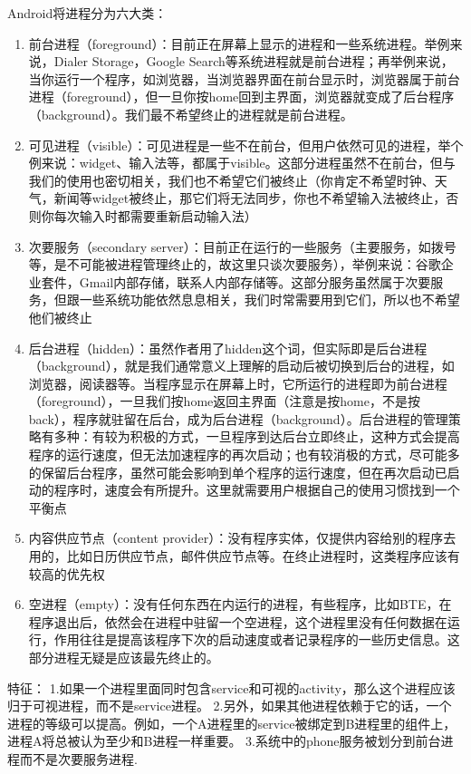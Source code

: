 \documentclass[a4paper, 11pt]{article}
\begin{document}
Android将进程分为六大类：
\begin{enumerate}
    \item 前台进程（foreground）：目前正在屏幕上显示的进程和一些系统进程。举例来说，Dialer Storage，Google Search等系统进程就是前台进程；再举例来说，当你运行一个程序，如浏览器，当浏览器界面在前台显示时，浏览器属于前台进程（foreground），但一旦你按home回到主界面，浏览器就变成了后台程序（background）。我们最不希望终止的进程就是前台进程。
    \item 可见进程（visible）：可见进程是一些不在前台，但用户依然可见的进程，举个例来说：widget、输入法等，都属于visible。这部分进程虽然不在前台，但与我们的使用也密切相关，我们也不希望它们被终止（你肯定不希望时钟、天气，新闻等widget被终止，那它们将无法同步，你也不希望输入法被终止，否则你每次输入时都需要重新启动输入法）
    \item 次要服务（secondary server）：目前正在运行的一些服务（主要服务，如拨号等，是不可能被进程管理终止的，故这里只谈次要服务），举例来说：谷歌企业套件，Gmail内部存储，联系人内部存储等。这部分服务虽然属于次要服务，但跟一些系统功能依然息息相关，我们时常需要用到它们，所以也不希望他们被终止
    \item 后台进程（hidden）：虽然作者用了hidden这个词，但实际即是后台进程（background），就是我们通常意义上理解的启动后被切换到后台的进程，如浏览器，阅读器等。当程序显示在屏幕上时，它所运行的进程即为前台进程（foreground），一旦我们按home返回主界面（注意是按home，不是按back），程序就驻留在后台，成为后台进程（background）。后台进程的管理策略有多种：有较为积极的方式，一旦程序到达后台立即终止，这种方式会提高程序的运行速度，但无法加速程序的再次启动；也有较消极的方式，尽可能多的保留后台程序，虽然可能会影响到单个程序的运行速度，但在再次启动已启动的程序时，速度会有所提升。这里就需要用户根据自己的使用习惯找到一个平衡点
    \item 内容供应节点（content provider）：没有程序实体，仅提供内容给别的程序去用的，比如日历供应节点，邮件供应节点等。在终止进程时，这类程序应该有较高的优先权
    \item 空进程（empty）：没有任何东西在内运行的进程，有些程序，比如BTE，在程序退出后，依然会在进程中驻留一个空进程，这个进程里没有任何数据在运行，作用往往是提高该程序下次的启动速度或者记录程序的一些历史信息。这部分进程无疑是应该最先终止的。
\end{enumerate}

特征：
1.如果一个进程里面同时包含service和可视的activity，那么这个进程应该归于可视进程，而不是service进程。
2.另外，如果其他进程依赖于它的话，一个进程的等级可以提高。例如，一个A进程里的service被绑定到B进程里的组件上，进程A将总被认为至少和B进程一样重要。
3.系统中的phone服务被划分到前台进程而不是次要服务进程.
\end{document}
